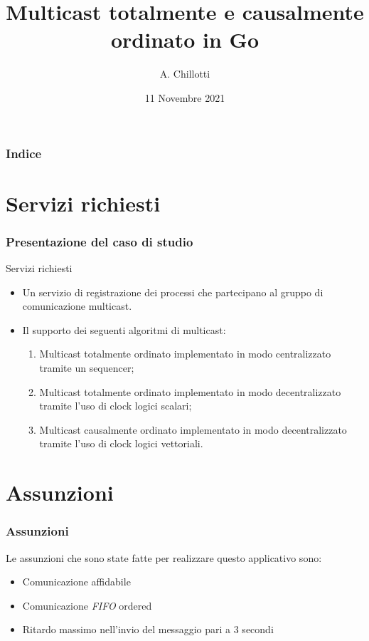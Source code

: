 \documentclass[
	usepdftitle=false,
	xcolor={table, dvipsnames},
	hyperref={
		pdftitle={Multicast totalmente e causalmente ordinato in Go},
    	pdfauthor={A. Chillotti}
    }
]{beamer}
\title[Progetto SDCC]{Multicast totalmente e causalmente ordinato in Go}
\author{A. Chillotti}
\institute[]{Università degli studi di Roma Tor Vergata}
\date{11 Novembre 2021}
\begin{document}
\begin{frame}
\titlepage
\end{frame}

\begin{frame}
\frametitle{Indice}
\tableofcontents
\end{frame}

\section{Servizi richiesti} 
\begin{frame}
\frametitle{Presentazione del caso di studio}
\begin{block}{Servizi richiesti}
\begin{itemize}
\item Un servizio di registrazione dei processi che partecipano al gruppo di comunicazione multicast.
\item Il supporto dei seguenti algoritmi di multicast:
\begin{enumerate}
\item Multicast totalmente ordinato implementato in modo centralizzato tramite un sequencer;
\item Multicast totalmente ordinato implementato in modo decentralizzato tramite l’uso di clock logici scalari;
\item Multicast causalmente ordinato implementato in modo decentralizzato tramite l’uso di clock logici vettoriali.
\end{enumerate}
\end{itemize}
\end{block}
\end{frame}

\section{Assunzioni}
\begin{frame}
\frametitle{Assunzioni}
Le assunzioni che sono state fatte per realizzare questo applicativo sono:
\begin{itemize}
\item Comunicazione affidabile
\item Comunicazione \textit{FIFO} ordered
\item Ritardo massimo nell'invio del messaggio pari a $3$ secondi
\end{itemize}
\end{frame}
\end{document}
